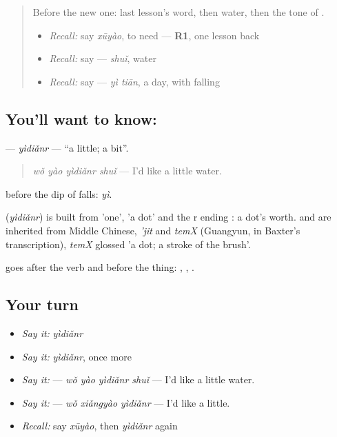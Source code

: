 \label{lesson:ZH-C91-yidianr}



\begin{quote}
Before the new one: last lesson's word, then water, then the tone of .

\begin{itemize}
\raggedright
  \item \emph{Recall:} say \emph{xūyào}, to need — \textbf{R1}, one lesson back
  \item \emph{Recall:} say  — \emph{shuǐ}, water
  \item \emph{Recall:} say  — \emph{yì tiān}, a day, with  falling
\end{itemize}
\end{quote}

\subsection*{You'll want to know: }
\textbf{} — \emph{yìdiǎnr} — \textquotedblleft{}a little; a bit\textquotedblright{}.

\begin{quote}
\textbf{} \emph{wǒ yào yìdiǎnr shuǐ} — I'd like a little water.
\end{quote}

 before the dip of  falls: \emph{yì}.

\begin{cousinweb}
\textbf{} (\emph{yìdiǎnr}) is built from  'one',  'a dot' and the r ending : a dot's worth.  and  are inherited from Middle Chinese, \emph{'jit} and \emph{temX} (Guangyun, in Baxter's transcription), \emph{temX} glossed 'a dot; a stroke of the brush'.
\end{cousinweb}

\begin{grammarlens}[title={What you've built}]
 goes after the verb and before the thing: , , .
\end{grammarlens}

\subsection*{Your turn}
\begin{itemize}
\raggedright
  \item \emph{Say it:} \emph{yìdiǎnr}
  \item \emph{Say it:} \emph{yìdiǎnr}, once more
  \item \emph{Say it:}  — \emph{wǒ yào yìdiǎnr shuǐ} — I'd like a little water.
  \item \emph{Say it:}  — \emph{wǒ xiǎngyào yìdiǎnr} — I'd like a little.
  \item \emph{Recall:} say \emph{xūyào}, then \emph{yìdiǎnr} again
\end{itemize}

